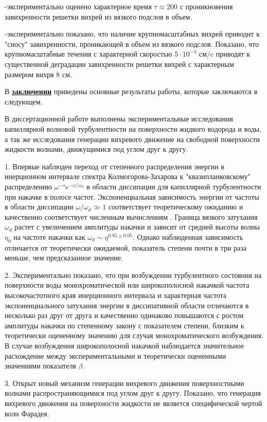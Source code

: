 -экспериментально оценено характерное время $\tau \approx 200$ с проникновения завихренности решетки вихрей из вязкого подслоя в объем. 

-экспериментально показано, что наличие крупномасштабных вихрей приводит к "сносу"{} завихренности, проникающей в объем из вязкого подслоя. Показано, что крупномасштабные течения с характерной скоростью $5 \cdot 10^{-3}$ см/c приводят к существенной деградации завихренности решетки вихрей с характерным размером вихря 8 см.


В \underline{\textbf{заключении}} приведены основные результаты работы, которые заключаются в следующем.

В диссертационной работе выполнены экспериментальные исследования капиллярной волновой турбулентности на поверхности жидкого водорода и воды, а так же исследования генерации вихревого движение на свободной поверхности жидкости волнами, движущимися под углом друг к другу.

1. Впервые наблюден переход от степенного распределения энергии в инерционном интервале спектра Колмогорова-Захарова к "квазипланковскому"{} распределению $\omega^{-s}e^{-\omega/\omega_d}$ в области диссипации для капиллярной турбулентности при накачке в полосе частот. Экспоненциальная зависимость энергии от частоты в области диссипации $\omega/\omega_d \gg 1$ соответствует теоретическому ожиданию и качественно соответствует численным вычислениям \cite{Ryzhenkova1990}. Граница вязкого затухания $\omega_d$ растет с увеличением амплитуды накачки и зависит от средней высоты волны $\eta_0$ на частоте накачки как $\omega_d \sim \eta^{0.85 \pm 0.05}$. Однако наблюденная зависимость отличается от теоретически ожидаемой, показатель степени почти в три раза меньше, чем предсказанное значение.

2. Экспериментально показано, что при возбуждении турбулентного состояния на поверхности воды монохроматической или широкополосной накачкой частота высокочастотного края инерционного интервала и характерная частота экспоненциального затухания энергии в диссипативной области отличаются в несколько раз друг от друга и качественно одинаково повышаются с ростом амплитуды накачки по степенному закону с показателем степени, близким к теоретически оцененному значению для случая монохроматического возбуждения. В случае возбуждения широкополосной накачкой наблюдается значительное расхождение между экспериментальными и теоретически оцененными значениями показателя $\beta$.

3. Открыт новый механизм генерации вихревого движения поверхностными волнами распространяющимися под углом друг к другу. Показано, что генерация вихревого движения на поверхности жидкости не является специфической чертой волн Фарадея.

